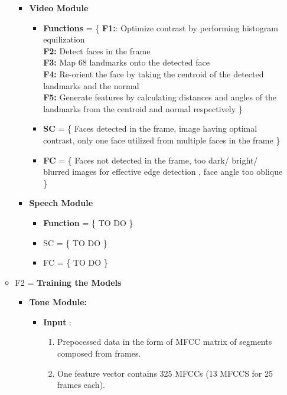 \documentclass[oneside,a4paper,12pt]{report}
\begin{document}
\begin{normalsize}
\begin{itemize}
\begin{itemize}
\begin{itemize}
		
		\item \textbf{Video Module}\\
		\begin{itemize}
			\item \textbf{Functions} = \{ \textbf{F1:}: Optimize contrast by performing histogram equilization \\ \textbf{F2:} Detect faces in the frame \\ \textbf{F3:} Map 68 landmarks onto the detected face \\ \textbf{F4:} Re-orient the face by taking the centroid of the detected landmarks and the normal \\ \textbf{F5:} Generate features by calculating distances and angles of the landmarks from the centroid and normal respectively \}\newline
			\item \textbf{SC} = \{ Faces detected in the frame, image having optimal contrast, only one face utilized from  multiple faces in the frame \}\newline
			\item \textbf{FC} = \{ Faces not detected in the frame, too dark/ bright/ blurred images for effective edge detection , face angle too oblique \}\newline
		\end{itemize}
		\vspace{4mm}
		\item \textbf{Speech Module}\\
		\begin{itemize}
			\item \textbf{Function} = \{ TO DO \}
			\item SC = \{ TO DO \}
			\item FC = \{ TO DO  \}
		\end{itemize}
	\end{itemize}
	\vspace{5mm}
	\item F2  =  \textbf{Training the Models}\\
	\begin{itemize}
		\item \textbf{Tone Module: }
		\begin{itemize}
			\item \textbf{Input} :
			\begin{enumerate}
				\item Prepocessed data in the form of MFCC matrix of segments composed from frames.
				\item  One feature vector contains 325 MFCCs (13 MFCCS for 25 frames each).				
			\end{enumerate}
		

\end{itemize}
\end{itemize}
\end{itemize}
\end{itemize}
\end{normalsize}
\end{document}
